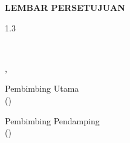 
\newpage
{}
\begin{center}
	\textbf{\large \MakeUppercase{lembar persetujuan {\tipe}}}
\end{center}

\begin{doublespace}
\end{doublespace}

\vspace{\baselineskip}

\begin{center}

	\begin{spacing}{1.3}
		\textbf{\large \MakeUppercase{\judulidtabbed}}
	\end{spacing}
	\vspace{1.5cm}
\end{center}

\vspace{-\baselineskip}

\begin{center}
	\begin{minipage}{0.45\textwidth}
		~
	\end{minipage}
	\hfill
	\begin{minipage}{0.45\textwidth}
		\begin{center}
			\hspace*{0.9cm}{\kota}, {\tglpersetujuan}
		\end{center}
	\end{minipage}
\end{center}

\vspace{\baselineskip}

\begin{center}
	\begin{minipage}{0.45\textwidth}
		\begin{center}
			Pembimbing Utama\\[3cm]
			({\pembimbingutama})\\
		\end{center}
	\end{minipage}
	\hfill
	\begin{minipage}{0.45\textwidth}
		\begin{center}
			Pembimbing Pendamping\\[3cm]
			({\pembimbingpendamping})\\
		\end{center}
	\end{minipage}
\end{center}

